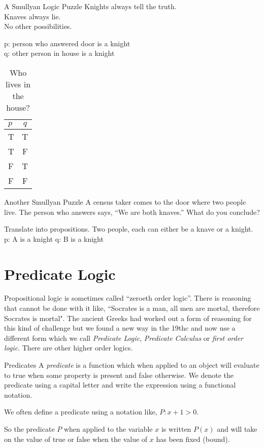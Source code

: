 \documentclass [handout]{beamer}
\begin{document}
\begin{frame}{A Smullyan Logic Puzzle}
Knights always tell the truth.\\
Knaves always lie.\\
No other possibilities.

p: person who answered door is a knight\\
q: other person in house is a knight
\begin{table}
\begin{tabular}{l | c   }
$p$ & $q$   \\
\hline \hline
T & T   \\ 
T & F   \\ 
F & T   \\ 
F & F   \\ 

\end{tabular}
\caption{Who lives in the house?}
\end{table}
\end{frame}

\begin{frame}{Another Smullyan Puzzle}
A census taker comes to the door where two people live. The person who answers says, ``We are both knaves.'' What do you conclude?

Translate into propositions. Two people, each can either be a knave or a knight. 
p: A is a knight
q: B is a knight
\end{frame}


\section{Predicate Logic}
\begin{frame}
Propositional logic is sometimes called ``zeroeth order logic''. There is reasoning that cannot be done with it like, ``Socrates is a man, all men are mortal, therefore Socrates is mortal". The ancient Greeks had worked out a form of reasoning for this kind of challenge but we found a new way in the 19thc and now use a different form which we call  \textit{Predicate Logic}, \textit{Predicate Calculus} or \textit{first order logic}. There are other higher order logics. 
\end{frame}


\begin{frame}{Predicates}
A \textit{predicate} is a function which when applied to an object will evaluate to true when some property is present and false otherwise. We denote the predicate using a capital letter and write the expression using a functional notation. 

We often define a predicate using a notation like, $P: x+1 > 0$.

So the predicate $P$ when applied to the variable $x$ is written $P(x)$ and will take on the value of true or false when the value of $x$ has been fixed (bound).
\end{frame}
\end{document}
